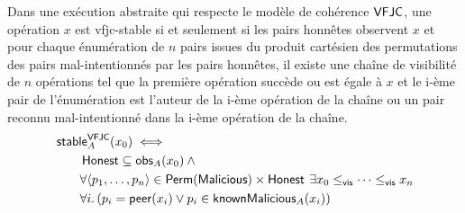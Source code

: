 \begin{theorem}\label{th:vfjc-stable}
Dans une exécution abstraite qui respecte le modèle de cohérence $\operatorname{\mathsf{VFJC}}$, une opération $x$ est vfjc-stable si et seulement si les pairs honnêtes observent $x$ et pour chaque énumération de $n$ pairs issues du produit cartésien des permutations des pairs mal-intentionnés par les pairs honnêtes, il existe une chaîne de visibilité de $n$ opérations tel que la première opération succède ou est égale à $x$ et le i-ème pair de l'énumération est l'auteur de la i-ème opération de la chaîne ou un pair reconnu mal-intentionné dans la i-ème opération de la chaîne.
\begin{equation*}\begin{split}
\MoveEqLeft\trm{stable}_A^{\trm{VFJC}}(x_0) \iff \\
    &\trm{Honest} \subseteq \trm{obs}_A(x_0) \:\land \\
    &\forall \tuple*{p_1,\dotsc, p_n} \in \trm{Perm}(\trm{Malicious}) \times \trm{Honest} \:\exists x_0 \viseq \dotsb \viseq x_n\\
    &\forall i \qsep (p_i = \trm{peer}(x_i) \lor p_i \in \trm{knownMalicious}_A(x_i))
\end{split}\end{equation*}
\end{theorem}



